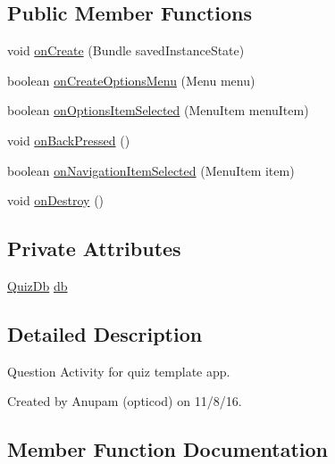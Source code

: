 \subsection*{Public Member Functions}
\begin{DoxyCompactItemize}
\item 
void \hyperlink{classorg_1_1buildmlearn_1_1quiztime_1_1activities_1_1QuestionActivity_a9347bfa9ecc2c9ac5b7d8211f502bee5}{on\+Create} (Bundle saved\+Instance\+State)
\item 
boolean \hyperlink{classorg_1_1buildmlearn_1_1quiztime_1_1activities_1_1QuestionActivity_aa77b6f56ee4b6fb8a10482c37063c5be}{on\+Create\+Options\+Menu} (Menu menu)
\item 
boolean \hyperlink{classorg_1_1buildmlearn_1_1quiztime_1_1activities_1_1QuestionActivity_ab9609ff74fa5b6995f07e63a5cfa5008}{on\+Options\+Item\+Selected} (Menu\+Item menu\+Item)
\item 
void \hyperlink{classorg_1_1buildmlearn_1_1quiztime_1_1activities_1_1QuestionActivity_a146cbf3fced547b70eb64fe63ab9ba89}{on\+Back\+Pressed} ()
\item 
boolean \hyperlink{classorg_1_1buildmlearn_1_1quiztime_1_1activities_1_1QuestionActivity_aabeed1d218b638042bfa26bdb3506bd4}{on\+Navigation\+Item\+Selected} (Menu\+Item item)
\item 
void \hyperlink{classorg_1_1buildmlearn_1_1quiztime_1_1activities_1_1QuestionActivity_adb7028629cc40df5dae541003ac39574}{on\+Destroy} ()
\end{DoxyCompactItemize}
\subsection*{Private Attributes}
\begin{DoxyCompactItemize}
\item 
\hyperlink{classorg_1_1buildmlearn_1_1quiztime_1_1data_1_1QuizDb}{Quiz\+Db} \hyperlink{classorg_1_1buildmlearn_1_1quiztime_1_1activities_1_1QuestionActivity_abe4c67792ea59f20f42050a5a77c8edf}{db}
\end{DoxyCompactItemize}


\subsection{Detailed Description}
Question Activity for quiz template app. 

Created by Anupam (opticod) on 11/8/16. 

\subsection{Member Function Documentation}
